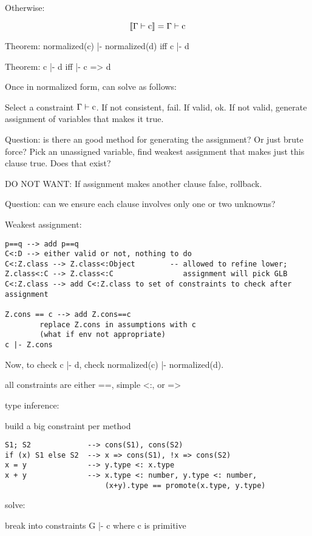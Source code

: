 \documentclass[preprint,nocopyrightspace,9pt]{sigplanconf}
\begin{document}
Otherwise:

\[
\SB{ \Gamma \vdash \Xcd{c} }
=
\Gamma \vdash \Xcd{c}
\]

Theorem:
normalized(c) |- normalized(d)
iff
c |- d

Theorem:
c |- d 
iff
|- c => d


Once in normalized form, can solve as follows:

Select a constraint $\Gamma \vdash \Xcd{c}$.
If not consistent, fail.
If valid, ok.
If not valid, generate assignment of variables that makes it true.

Question: is there an good method for generating the assignment?
Or just brute force?
Pick an unassigned variable, find weakest assignment that makes just
this clause true.  Does that exist?

DO NOT WANT:
If assignment makes another clause false, rollback.

Question: can we ensure each clause involves only one or two
unknowns?

Weakest assignment:

\begin{verbatim}
p==q --> add p==q
C<:D --> either valid or not, nothing to do
C<:Z.class --> Z.class<:Object        -- allowed to refine lower;
Z.class<:C --> Z.class<:C                assignment will pick GLB
C<:Z.class --> add C<:Z.class to set of constraints to check after assignment

Z.cons == c --> add Z.cons==c
        replace Z.cons in assumptions with c
        (what if env not appropriate)
c |- Z.cons
\end{verbatim}

Now, to check c |- d, check normalized(c) |- normalized(d).

        all constraints are either ==, simple <:, or =>



                
        

type inference:

build a big constraint per method

\begin{verbatim}
S1; S2             --> cons(S1), cons(S2)
if (x) S1 else S2  --> x => cons(S1), !x => cons(S2)
x = y              --> y.type <: x.type 
x + y              --> x.type <: number, y.type <: number,
                       (x+y).type == promote(x.type, y.type)
\end{verbatim}

solve:

        break into constraints G |- c where c is primitive
\end{document}

